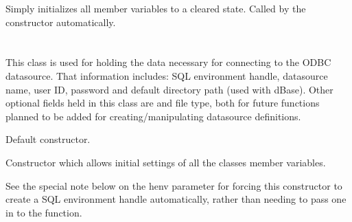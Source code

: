 \label{wxdbcolinfinitialize}

Simply initializes all member variables to a cleared state.  Called by
the constructor automatically.

\section{}\label{wxdbconnectinf}

This class is used for holding the data necessary for connecting to the ODBC
datasource.  That information includes: SQL environment handle, datasource
name, user ID, password and default directory path (used with dBase).  Other
optional fields held in this class are and file type, both for future
functions planned to be added for creating/manipulating datasource definitions.



Default constructor.


Constructor which allows initial settings of all the classes member variables.

See the special note below on the henv parameter for forcing this constructor
to create a SQL environment handle automatically, rather than needing to pass
one in to the function.


